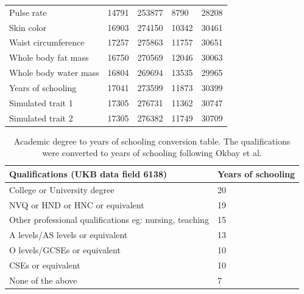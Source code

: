 \documentclass[hidelinks, 12pt]{article}
\begin{document}
\begin{table}[h]
\begin{center}
{\begin{tabular}{| l l l l l |}
Pulse rate & 14791 & 253877 & 8790 & 28208 \\
Skin color & 16903 & 274150 & 10342 & 30461 \\
Waist circumference & 17257 & 275863 & 11757 & 30651 \\
Whole body fat mass & 16750 & 270569 & 12046 & 30063 \\
Whole body water mass & 16804 & 269694 & 13535 & 29965 \\
Years of schooling & 17041 & 273599 & 11873 & 30399 \\
   \hline\hline
Simulated trait 1 & 17305 & 276731 & 11362 & 30747 \\
Simulated trait 2 & 17305 & 276382 & 11749 & 30709 \\
   \hline
 \end{tabular}}
\end{center}
\end{table}

\pagebreak

\begin{table}[h]
\caption[Academic degree to years of schooling conversion table]{\small Academic degree to years of schooling conversion table. The qualifications were converted to years of schooling following Okbay et al. \cite{okbay2016genome}}
\begin{center}
 \begin{tabular}{| l l |} 
 \hline
 \textbf{Qualifications (UKB data field 6138)} & \textbf{Years of schooling} \\ [0.5ex] 
 \hline\hline
  College or University degree  & 20  \\ 
  NVQ or HND or HNC or equivalent & 19  \\
  Other professional qualifications eg: nursing, teaching  & 15  \\
  A levels/AS levels or equivalent & 13  \\
  O levels/GCSEs or equivalent  & 10  \\
  CSEs or equivalent & 10  \\
  None of the above & 7  \\
   \hline
 \end{tabular}
\end{center}
\label{eduyears_table}
\end{table}
\pagebreak
\end{document}
